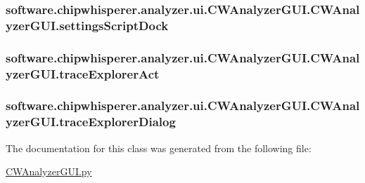 \subsubsection[{settings\+Script\+Dock}]{\setlength{\rightskip}{0pt plus 5cm}software.\+chipwhisperer.\+analyzer.\+ui.\+C\+W\+Analyzer\+G\+U\+I.\+C\+W\+Analyzer\+G\+U\+I.\+settings\+Script\+Dock}\label{classsoftware_1_1chipwhisperer_1_1analyzer_1_1ui_1_1CWAnalyzerGUI_1_1CWAnalyzerGUI_aba0c42a6a949323a24e53f2a117bbe98}
\hypertarget{classsoftware_1_1chipwhisperer_1_1analyzer_1_1ui_1_1CWAnalyzerGUI_1_1CWAnalyzerGUI_a04dd4816db7905dbc338fb2ced731421}{}
\subsubsection[{trace\+Explorer\+Act}]{\setlength{\rightskip}{0pt plus 5cm}software.\+chipwhisperer.\+analyzer.\+ui.\+C\+W\+Analyzer\+G\+U\+I.\+C\+W\+Analyzer\+G\+U\+I.\+trace\+Explorer\+Act}\label{classsoftware_1_1chipwhisperer_1_1analyzer_1_1ui_1_1CWAnalyzerGUI_1_1CWAnalyzerGUI_a04dd4816db7905dbc338fb2ced731421}
\hypertarget{classsoftware_1_1chipwhisperer_1_1analyzer_1_1ui_1_1CWAnalyzerGUI_1_1CWAnalyzerGUI_a806223047f8a757b4b5972c5cc3592dd}{}
\subsubsection[{trace\+Explorer\+Dialog}]{\setlength{\rightskip}{0pt plus 5cm}software.\+chipwhisperer.\+analyzer.\+ui.\+C\+W\+Analyzer\+G\+U\+I.\+C\+W\+Analyzer\+G\+U\+I.\+trace\+Explorer\+Dialog}\label{classsoftware_1_1chipwhisperer_1_1analyzer_1_1ui_1_1CWAnalyzerGUI_1_1CWAnalyzerGUI_a806223047f8a757b4b5972c5cc3592dd}


The documentation for this class was generated from the following file\+:\begin{DoxyCompactItemize}
\item 
\hyperlink{CWAnalyzerGUI_8py}{C\+W\+Analyzer\+G\+U\+I.\+py}\end{DoxyCompactItemize}
